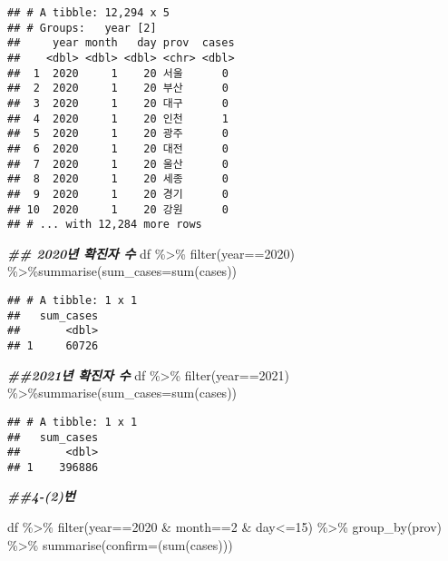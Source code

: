 \documentclass[
  12pt,
]{article}
\newenvironment{Shaded}{\begin{snugshade}}{\end{snugshade}}
\newcommand{\AttributeTok}[1]{\textcolor[rgb]{0.77,0.63,0.00}{#1}}
\newcommand{\DecValTok}[1]{\textcolor[rgb]{0.00,0.00,0.81}{#1}}
\newcommand{\DocumentationTok}[1]{\textcolor[rgb]{0.56,0.35,0.01}{\textbf{\textit{#1}}}}
\newcommand{\FunctionTok}[1]{\textcolor[rgb]{0.00,0.00,0.00}{#1}}
\newcommand{\NormalTok}[1]{#1}
\newcommand{\SpecialCharTok}[1]{\textcolor[rgb]{0.00,0.00,0.00}{#1}}
\begin{document}
\begin{verbatim}
## # A tibble: 12,294 x 5
## # Groups:   year [2]
##     year month   day prov  cases
##    <dbl> <dbl> <dbl> <chr> <dbl>
##  1  2020     1    20 서울      0
##  2  2020     1    20 부산      0
##  3  2020     1    20 대구      0
##  4  2020     1    20 인천      1
##  5  2020     1    20 광주      0
##  6  2020     1    20 대전      0
##  7  2020     1    20 울산      0
##  8  2020     1    20 세종      0
##  9  2020     1    20 경기      0
## 10  2020     1    20 강원      0
## # ... with 12,284 more rows
\end{verbatim}

\begin{Shaded}
\begin{Highlighting}[]
\DocumentationTok{\#\# 2020년 확진자 수}
\NormalTok{df }\SpecialCharTok{\%\textgreater{}\%} \FunctionTok{filter}\NormalTok{(year}\SpecialCharTok{==}\DecValTok{2020}\NormalTok{) }\SpecialCharTok{\%\textgreater{}\%}\FunctionTok{summarise}\NormalTok{(}\AttributeTok{sum\_cases=}\FunctionTok{sum}\NormalTok{(cases))}
\end{Highlighting}
\end{Shaded}

\begin{verbatim}
## # A tibble: 1 x 1
##   sum_cases
##       <dbl>
## 1     60726
\end{verbatim}

\begin{Shaded}
\begin{Highlighting}[]
\DocumentationTok{\#\#2021년 확진자 수}
\NormalTok{df }\SpecialCharTok{\%\textgreater{}\%} \FunctionTok{filter}\NormalTok{(year}\SpecialCharTok{==}\DecValTok{2021}\NormalTok{) }\SpecialCharTok{\%\textgreater{}\%}\FunctionTok{summarise}\NormalTok{(}\AttributeTok{sum\_cases=}\FunctionTok{sum}\NormalTok{(cases))}
\end{Highlighting}
\end{Shaded}

\begin{verbatim}
## # A tibble: 1 x 1
##   sum_cases
##       <dbl>
## 1    396886
\end{verbatim}

\begin{Shaded}
\begin{Highlighting}[]
\DocumentationTok{\#\#4{-}(2)번}

\NormalTok{df }\SpecialCharTok{\%\textgreater{}\%} \FunctionTok{filter}\NormalTok{(year}\SpecialCharTok{==}\DecValTok{2020} \SpecialCharTok{\&}\NormalTok{ month}\SpecialCharTok{==}\DecValTok{2} \SpecialCharTok{\&}\NormalTok{ day}\SpecialCharTok{\textless{}=}\DecValTok{15}\NormalTok{) }\SpecialCharTok{\%\textgreater{}\%} \FunctionTok{group\_by}\NormalTok{(prov) }\SpecialCharTok{\%\textgreater{}\%} \FunctionTok{summarise}\NormalTok{(}\AttributeTok{confirm=}\NormalTok{(}\FunctionTok{sum}\NormalTok{(cases)))}
\end{Highlighting}
\end{Shaded}
\end{document}
